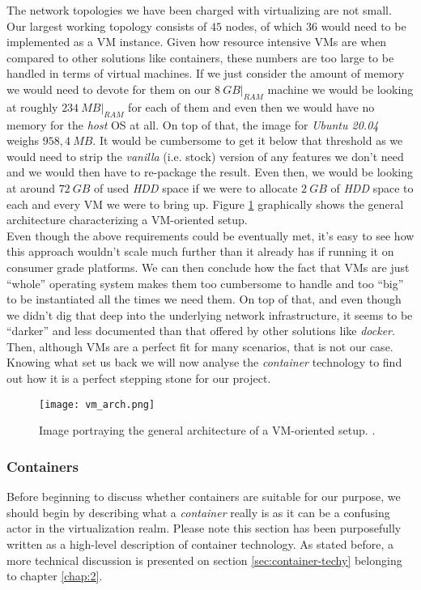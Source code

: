                 The network topologies we have been charged with virtualizing are not small. Our largest working topology consists of $45$ nodes, of which $36$ would need to be implemented as a VM instance. Given how resource intensive VMs are when compared to other solutions like containers, these numbers are too large to be handled in terms of virtual machines. If we just consider the amount of memory we would need to devote for them on our $8\ GB\rvert_{RAM}$ machine we would be looking at roughly $234\ MB\rvert_{RAM}$ for each of them and even then we would have no memory for the \textit{host} OS at all. On top of that, the image for \textit{Ubuntu 20.04} weighs $958,4\ MB$. It would be cumbersome to get it below that threshold as we would need to strip the \textit{vanilla} (i.e. stock) version of any features we don't need and we would then have to re-package the result. Even then, we would be looking at around $72\ GB$ of used \textit{HDD} space if we were to allocate $2\ GB$ of \textit{HDD} space to each and every VM we were to bring up. Figure \ref{fig:vm-arch} graphically shows the general architecture characterizing a VM-oriented setup.\\

                Even though the above requirements could be eventually met, it's easy to see how this approach wouldn't scale much further than it already has if running it on consumer grade platforms. We can then conclude how the fact that VMs are just ``whole'' operating system makes them too cumbersome to handle and too ``big'' to be instantiated all the times we need them. On top of that, and even though we didn't dig that deep into the underlying network infrastructure, it seems to be ``darker'' and less documented than that offered by other solutions like \textit{docker}. Then, although VMs are a perfect fit for many scenarios, that is not our case. Knowing what set us back we will now analyse the \textit{container} technology to find out how it is a perfect stepping stone for our project.

                \begin{figure}
                    \centering
                    \texttt{[image: vm\_arch.png]}
                    \caption[VM Setup]{Image portraying the general architecture of a VM-oriented setup. \cite{bib:vm-setup-img}.}
                    \label{fig:vm-arch}
                \end{figure}

            \subsubsection{Containers} \label{sec:container-intro}
                Before beginning to discuss whether containers are suitable for our purpose, we should begin by describing what a \textit{container} really is as it can be a confusing actor in the virtualization realm. Please note this section has been purposefully written as a high-level description of container technology. As stated before, a more technical discussion is presented on section \ref{sec:container-techy} belonging to chapter \ref{chap:2}.\\

